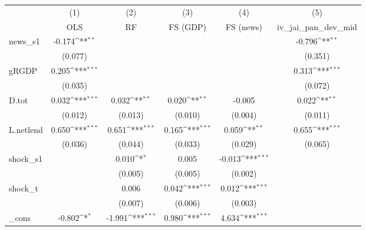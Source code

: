 {
\def\sym#1{\ifmmode^{#1}\else\(^{#1}\)\fi}
\begin{tabular}{l*{5}{c}}
\toprule
            &\multicolumn{1}{c}{(1)}&\multicolumn{1}{c}{(2)}&\multicolumn{1}{c}{(3)}&\multicolumn{1}{c}{(4)}&\multicolumn{1}{c}{(5)}\\
            &\multicolumn{1}{c}{OLS}&\multicolumn{1}{c}{RF}&\multicolumn{1}{c}{FS (GDP)}&\multicolumn{1}{c}{FS (news)}&\multicolumn{1}{c}{iv\_jai\_pan\_dev\_mid}\\
\midrule
news\_s1     &      -0.174\sym{**} &                     &                     &                     &      -0.796\sym{**} \\
            &     (0.077)         &                     &                     &                     &     (0.351)         \\
\addlinespace
gRGDP       &       0.205\sym{***}&                     &                     &                     &       0.313\sym{***}\\
            &     (0.035)         &                     &                     &                     &     (0.072)         \\
\addlinespace
D.tot       &       0.032\sym{***}&       0.032\sym{**} &       0.020\sym{**} &      -0.005         &       0.022\sym{**} \\
            &     (0.012)         &     (0.013)         &     (0.010)         &     (0.004)         &     (0.011)         \\
\addlinespace
L.netlend   &       0.650\sym{***}&       0.651\sym{***}&       0.165\sym{***}&       0.059\sym{**} &       0.655\sym{***}\\
            &     (0.036)         &     (0.044)         &     (0.033)         &     (0.029)         &     (0.065)         \\
\addlinespace
shock\_s1    &                     &       0.010\sym{*}  &       0.005         &      -0.013\sym{***}&                     \\
            &                     &     (0.005)         &     (0.005)         &     (0.002)         &                     \\
\addlinespace
shock\_t     &                     &       0.006         &       0.042\sym{***}&       0.012\sym{***}&                     \\
            &                     &     (0.007)         &     (0.006)         &     (0.003)         &                     \\
\addlinespace
\_cons      &      -0.802\sym{*}  &      -1.991\sym{***}&       0.980\sym{***}&       4.634\sym{***}&                     \\

\end{tabular}}
